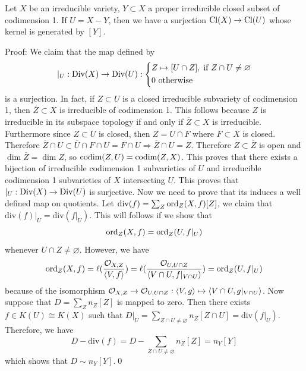 \begin{dang}
    \begin{lemma}
        Let $X$ be an irreducible variety, $Y\subset X$ a proper irreducible closed subset of codimension 1. If 
        $U = X- Y$, then we have a surjection $\text{Cl}(X)\to\text{Cl}(U)$ whose kernel is generated 
        by $[Y]$.
    \end{lemma}
\end{dang}
Proof: We claim that the map defined by 
\begin{equation}
    |_U:\text{Div}(X)\to\text{Div}(U):\left\{\begin{aligned}
        &Z\mapsto [U\cap Z],\;\text{if }Z\cap U\neq\varnothing\\
        &0 \text{ otherwise} 
    \end{aligned}\right.
\end{equation}
is a surjection. In fact, if $Z\subset U$ is a closed irreducible subvariety 
of codimension 1, then 
$\overline{Z}\subset X$ is irreducible of codimension 1. This follows because 
$Z$ is irreducible in its subspace topology if and only if $\overline{Z}\subset X$ is irreducible. Furthermore 
since $Z\subset U$ is closed, then $Z = U\cap F$ where $F\subset X$ is closed. Therefore 
$\overline{Z}\cap U \subset \overline{U}\cap F\cap U = F\cap U \Rightarrow \overline{Z}\cap U = Z$. Therefore 
$Z\subset \overline{Z}$ is open and $\dim\overline{Z}=\dim Z$, so $\text{codim}(Z,U)=\text{codim}(Z,X)$. This proves that 
there exists a bijection of irreducible codimension 1 subvarieties of $U$ and irreducible codimension 1 
subvarieties of $X$ intersecting $U$. This proves that $|_U:\text{Div}(X)\to \text{Div}(U)$ is surjective. Now we need to 
prove that its induces a well defined map on quotients. Let 
$\text{div}(f) = \sum_Z\text{ord}_Z(X,f)[Z]$, we claim that $\text{div}(f)|_U=\text{div}(f|_U)$. This will follows if 
we show that 
\begin{equation}
    \text{ord}_Z(X,f) = \text{ord}_Z(U,f|_U)
\end{equation}
whenever $U\cap Z\neq\varnothing$. However, we have 
\begin{equation}
   \text{ord}_Z(X,f) = \ell(\frac{\mathcal{O}_{X,Z}}{\langle V,f\rangle}) = \ell(\frac{\mathcal{O}_{U,U\cap Z}}{\langle V\cap U,f|_{V\cap U}\rangle})
   = \text{ord}_Z(U,f|_U)
\end{equation}
because of the isomorphism $\mathcal{O}_{X,Z}\to \mathcal{O}_{U,U\cap Z}: \langle V,g\rangle\mapsto \langle V\cap U,g|_{V\cap U}\rangle$. 
Now suppose that $D = \sum_Z n_Z[Z]$ is mapped to zero. Then there exists 
$f\in K(U) \cong K(X)$ such that $D|_U = \sum_{Z\cap U\neq\varnothing}n_Z[Z\cap U]=\text{div}(f|_U)$. 
Therefore, we have 
\begin{equation}
     D - \text{div}(f)= D - \sum_{Z\cap U\neq\varnothing}n_Z[Z] = n_Y[Y]
\end{equation}
which shows that $D\sim n_Y[Y]$.\qed


